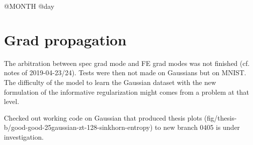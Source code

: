 \documentclass[11pt,a4paper]{article}
\begin{document}

{\Huge @MONTH @day}

\section*{Grad propagation}

The arbitration between spec grad mode and FE grad modes was not finished (cf.
notes of 2019-04-23/24). Tests were then not made on Gaussians but on MNIST. The difficulty of
the model to learn the Gaussian dataset with the new formulation of the
informative regularization might comes from a problem at that level.

Checked out working code on Gaussian that produced thesis plots
(fig/thesis-b/good-good-25gaussian-zt-128-sinkhorn-entropy) to new branch 0405 is under
investigation.

\printbibliography{}
\end{document}
